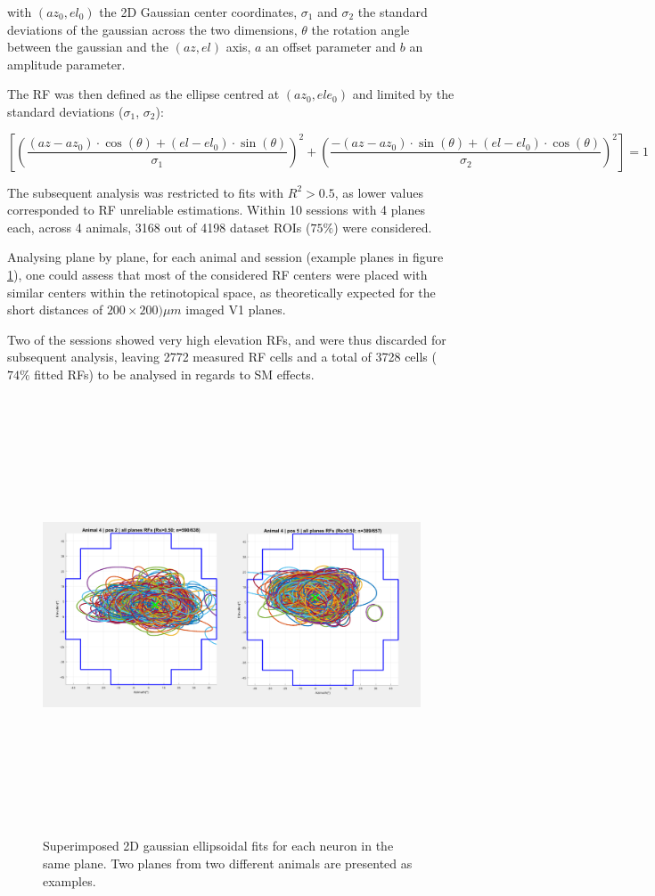 with $(az_0, el_0)$ the 2D Gaussian center coordinates, $\sigma_1$ and $\sigma_2$ the standard deviations of the gaussian across the two dimensions, $\theta$ the rotation angle between the gaussian and the $(az,el)$ axis, $a$ an offset parameter and $b$ an amplitude parameter.

The RF was then defined as the ellipse centred at $(az_0, ele_0)$ and limited by the standard deviations  ($\sigma_1$, $\sigma_2$):

\begin{equation}
\left[ \left( \dfrac{(az-az_0)\cdot \cos(\theta) + (el-el_0)\cdot \sin(\theta)}{\sigma_1}\right)^2 + \left(\dfrac{-(az-az_0)\cdot \sin(\theta) + (el-el_0)\cdot \cos(\theta)}{\sigma_2}\right)^2\right]=1
\end{equation}

The subsequent analysis was restricted to fits with $R^2>0.5$, as lower values corresponded to RF unreliable estimations. Within 10 sessions with 4 planes each, across 4 animals, 3168 out of 4198 dataset ROIs ($75\%$) were considered.

Analysing plane by plane, for each animal and session (example planes in figure \ref{ellipses}), one could assess that most of the considered RF centers were placed with similar centers within the retinotopical space, as theoretically expected for the short distances of $200 \times 200) \mu m$ imaged V1 planes. 

Two of the sessions showed very high elevation RFs, and were thus discarded for subsequent analysis, leaving 2772 measured RF cells and a total of 3728 cells ($74\%$ fitted RFs) to be analysed in regards to SM effects.

\begin{figure}[H] \centering \includegraphics[width=13cm,height=13cm,keepaspectratio]{Figures/7.Results/rf/ellipsesAnimal4pos2andpos5.png} 
\caption{Superimposed 2D gaussian ellipsoidal fits for each neuron in the same plane. Two planes from two different animals are presented as examples.}
\label{ellipses}
\end{figure}


